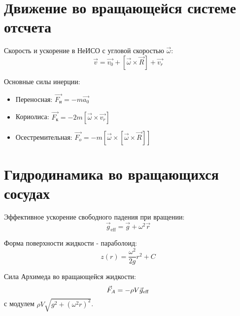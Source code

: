 \documentclass{article}
\begin{document}
\section*{Движение во вращающейся системе отсчета}

Скорость и ускорение в НеИСО с угловой скоростью $\vec{\omega}$:
\[\vec{v} = \vec{v_0}+ [\vec{\omega} \times\vec{R}]+\vec{v_r}\]

Основные силы инерции:
\begin{itemize}
\item Переносная: $\vec{F_{\text{и}}} = -m\vec{a_0}$
\item Кориолиса: $\vec{F_\text{к}} = -2m[\vec{\omega} \times\vec{v_r}]$
\item Осестремительная: $\vec{F_{o}} = -m[\vec{\omega} \times[\vec{\omega} \times\vec{R}]]$
\end{itemize}

\section*{Гидродинамика во вращающихся сосудах}

Эффективное ускорение свободного падения при вращении:
\[\vec g_\text{eff} = \vec{g} +\omega^2\vec r\]

Форма поверхности жидкости - параболоид:
\[z(r) = \frac{\omega^2}{2g}r^2+C\]

Сила Архимеда во вращающейся жидкости:
\[\vec F_A = -\rho V\vec g_{\rm eff}\]
с модулем $\rho V\sqrt{g^2 + (\omega^2r)^2}$.
\end{document}
